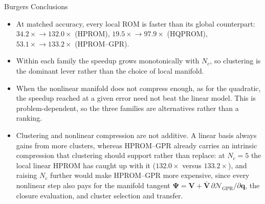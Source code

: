 \documentclass[aspectratio=169]{beamer}
\begin{document}
\begin{frame}{Burgers Conclusions}
\small
\begin{itemize}
  \item At matched accuracy, every local ROM is faster than its global counterpart:
        $34.2\times\!\to\!132.0\times$ (HPROM), $19.5\times\!\to\!97.9\times$ (HQPROM),
        $53.1\times\!\to\!133.2\times$ (HPROM--GPR).
  \item Within each family the speedup grows monotonically with $N_c$, so clustering is
        the dominant lever rather than the choice of local manifold.
  \item When the nonlinear manifold does not compress enough, as for the quadratic, the
        speedup reached at a given error need not beat the linear model. This is
        problem-dependent, so the three families are alternatives rather than a ranking.
  \item Clustering and nonlinear compression are not additive. A linear basis always gains
        from more clusters, whereas HPROM--GPR already carries an intrinsic compression
        that clustering should support rather than replace: at $N_c=5$ the local linear
        HPROM has caught up with it ($132.0\times$ versus $133.2\times$), and raising
        $N_c$ further would make HPROM--GPR more expensive, since every nonlinear step
        also pays for the manifold tangent
        $\mathbf{\Psi}=\mathbf{V}+\bar{\mathbf{V}}\,\partial\mathcal{N}_{\mathrm{GPR}}/
        \partial\mathbf{q}$, the closure evaluation, and cluster selection and transfer.
\end{itemize}
\end{frame}
\end{document}
